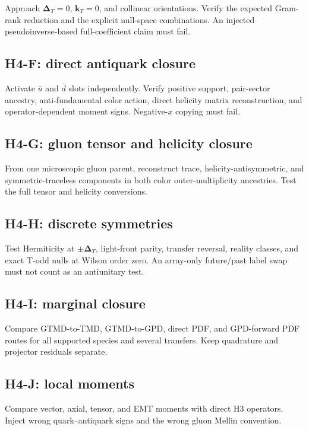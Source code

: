 \documentclass[11pt]{article}
\newcommand{\kT}{\bm{k}_{T}}
\newcommand{\DT}{\bm{\Delta}_{T}}
\begin{document}
Approach \(\DT=0\), \(\kT=0\), and collinear orientations.  Verify the
expected Gram-rank reduction and the explicit null-space combinations.  An
injected pseudoinverse-based full-coefficient claim must fail.

\subsection{H4-F: direct antiquark closure}

Activate \(\bar u\) and \(\bar d\) slots independently.  Verify positive
support, pair-sector ancestry, anti-fundamental color action, direct helicity
matrix reconstruction, and operator-dependent moment signs.  Negative-\(x\)
copying must fail.

\subsection{H4-G: gluon tensor and helicity closure}

From one microscopic gluon parent, reconstruct trace,
helicity-antisymmetric, and symmetric-traceless components in both color
outer-multiplicity ancestries.  Test the full tensor and helicity conversions.

\subsection{H4-H: discrete symmetries}

Test Hermiticity at \(\pm\DT\), light-front parity, transfer reversal,
reality classes, and exact T-odd nulls at Wilson order zero.  An array-only
future/past label swap must not count as an antiunitary test.

\subsection{H4-I: marginal closure}

Compare GTMD-to-TMD, GTMD-to-GPD, direct PDF, and GPD-forward PDF routes for
all supported species and several transfers.  Keep quadrature and projector
residuals separate.

\subsection{H4-J: local moments}

Compare vector, axial, tensor, and EMT moments with direct H3 operators.
Inject wrong quark--antiquark signs and the wrong gluon Mellin convention.
\end{document}
